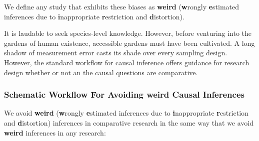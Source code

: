 \documentclass[
  single column]{article}
\begin{document}
We define any study that exhibits these biases as \textbf{weird}
(\textbf{w}rongly \textbf{e}stimated inferences due to
\textbf{i}nappropriate \textbf{r}estriction and \textbf{d}istortion).

It is laudable to seek species-level knowledge. However, before
venturing into the gardens of human existence, accessible gardens must
have been cultivated. A long shadow of measurement error casts its shade
over every sampling design. However, the standard workflow for causal
inference offers guidance for research design whether or not an the
causal questions are comparative.

\subsubsection{Schematic Workflow For Avoiding weird Causal
Inferences}\label{schematic-workflow-for-avoiding-weird-causal-inferences}

We avoid \textbf{weird} (\textbf{w}rongly \textbf{e}stimated inferences
due to \textbf{i}nappropriate \textbf{r}estriction and
\textbf{d}istortion) inferences in comparative research in the same way
that we avoid \textbf{weird} inferences in any research:
\end{document}
